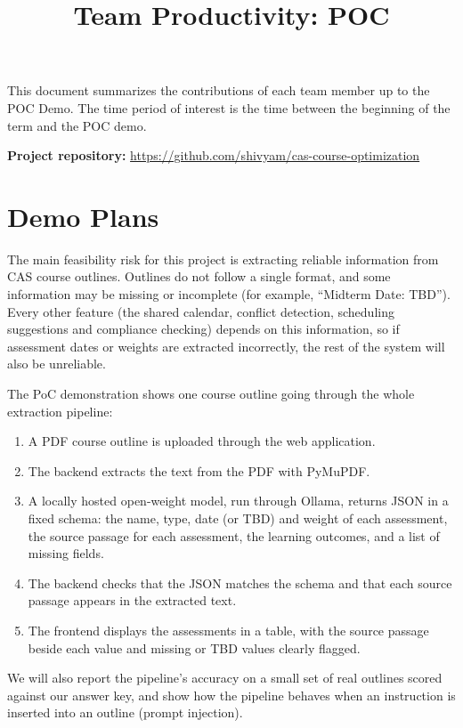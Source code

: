 \documentclass{article}
\title{Team Productivity: POC\\\progname}
\author{\authname}
\date{}
\begin{document}
\maketitle
\sloppy

This document summarizes the contributions of each team member up to the POC
Demo.  The time period of interest is the time between the beginning of the term
and the POC demo.

\noindent \textbf{Project repository:}
\url{https://github.com/shivyam/cas-course-optimization}

\section{Demo Plans}

The main feasibility risk for this project is extracting reliable information
from CAS course outlines. Outlines do not follow a single format, and some
information may be missing or incomplete (for example, ``Midterm Date: TBD'').
Every other feature (the shared calendar, conflict detection, scheduling
suggestions and compliance checking) depends on this information, so if
assessment dates or weights are extracted incorrectly, the rest of the system
will also be unreliable.

\bigskip
\noindent The PoC demonstration shows one course outline going through the
whole extraction pipeline:

\begin{enumerate}
  \item A PDF course outline is uploaded through the web application.
  \item The backend extracts the text from the PDF with PyMuPDF.
  \item A locally hosted open-weight model, run through Ollama, returns JSON in
  a fixed schema: the name, type, date (or TBD) and weight of each assessment,
  the source passage for each assessment, the learning outcomes, and a list of
  missing fields.
  \item The backend checks that the JSON matches the schema and that each
  source passage appears in the extracted text.
  \item The frontend displays the assessments in a table, with the source
  passage beside each value and missing or TBD values clearly flagged.
\end{enumerate}

\noindent We will also report the pipeline's accuracy on a small set of real
outlines scored against our answer key, and show how the pipeline behaves when
an instruction is inserted into an outline (prompt injection).
\end{document}
